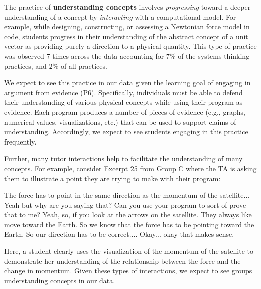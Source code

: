 \documentclass{msuphddissertation}
\begin{document}
\begin{doublespace}
\begin{appendices}
The practice of \textbf{understanding concepts} involves \textit{progressing} toward a deeper understanding of a concept by \textit{interacting} with a computational model.  For example, while designing, constructing, or assessing a Newtonian force model in code, students progress in their understanding of the abstract concept of a unit vector as providing purely a direction to a physical quantity.  This type of practice was observed $7$ times across the data  accounting for $7\%$ of the systems thinking practices, and $2\%$ of all practices.

We expect to see this practice in our data given the learning goal of engaging in argument from evidence (P6).  Specifically, individuals must be able to defend their understanding of various physical concepts while using their program as evidence.  Each program produces a number of pieces of evidence (e.g., graphs, numerical values, visualizations, etc.) that can be used to support claims of understanding.  Accordingly, we expect to see students engaging in this practice frequently.

Further, many tutor interactions help to facilitate the understanding of many concepts.  For example, consider Excerpt 25 from Group C where the TA is asking them to illustrate a point they are trying to make with their program: \begin{description}
\SA The force has to point in the same direction as the momentum of the satellite...
\TA Yeah but why are you saying that?
\TA Can you use your program to sort of prove that to me?
\SA Yeah, so, if you look at the arrows on the satellite.
\SA They always like move toward the Earth.
\SA So we know that the force has to be pointing toward the Earth.
\SA So our direction has to be correct....
\TA Okay... okay that makes sense.
\end{description}  Here, a student clearly uses the visualization of the momentum of the satellite to demonstrate her understanding of the relationship between the force and the change in momentum.  Given these types of interactions, we expect to see groups understanding concepts in our data.


\end{appendices}
\end{doublespace}
\end{document}
